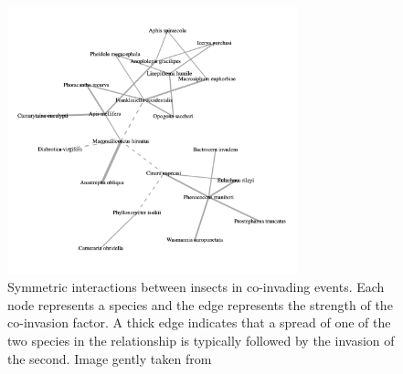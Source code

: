 \documentclass[mscthesis]{usiinfthesis}
\begin{document}

\begin{figure}[H]
    \centering
    \includegraphics[width=0.75\textwidth]{coinvasion.png}
    \caption{Symmetric interactions between insects in co-invading events. Each node represents a species and the edge represents the strength of the co-invasion factor. A thick edge indicates that a spread of one of the two species in the relationship is typically followed by the invasion of the second. Image gently taken from \cite{intro:ecological}}
    \label{fig:hist_tax_fam}
\end{figure}
\end{document}
